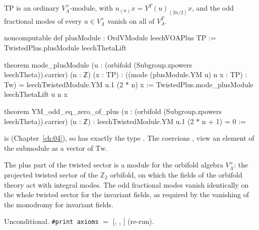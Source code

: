 \begin{theorem}\label{ch08:thm:leechplus}
$\mathrm{TP}$ is an ordinary $V_\Lambda^+$-module, with $u_{(n)}x=Y^T(u)_{(2n/2)}x$, and the odd
fractional modes of every $u\in V_\Lambda^+$ vanish on all of $V_\Lambda^T$.
\end{theorem}
\begin{leancode}
noncomputable def plusModule : OrdVModule leechVOAPlus TP :=
  TwistedPlus.plusModule leechThetaLift

theorem mode_plusModule (u : (orbifold (Subgroup.zpowers leechTheta)).carrier) (n : ℤ) (x : TP) :
    ((mode (plusModule.YM u) n x : TP) : Tw) = leechTwistedModule.YM u.1 (2 * n) x :=
  TwistedPlus.mode_plusModule leechThetaLift u n x

theorem YM_odd_eq_zero_of_plus (u : (orbifold (Subgroup.zpowers leechTheta)).carrier) (n : ℤ) :
    leechTwistedModule.YM u.1 (2 * n + 1) = 0 :=
\end{leancode}
\begin{dictionary}
 is  (Chapter~\ref{ch:04}), so
 has exactly the type
.  The coercions ,  view an element
of the submodule as a vector of $\mathrm{Tw}$.
\end{dictionary}

\begin{physics}
The plus part of the twisted sector is a module for the orbifold algebra $V_\Lambda^+$: the projected twisted sector of the $\mathbb Z_2$ orbifold, on which the fields of the orbifold theory act with integral modes. The odd fractional modes vanish identically on the whole twisted sector for the invariant fields, as required by the vanishing of the monodromy for invariant fields.
\end{physics}
\begin{status}
Unconditional.  \texttt{\#print axioms}  $=$ [,
, ] (re-run).
\end{status}

